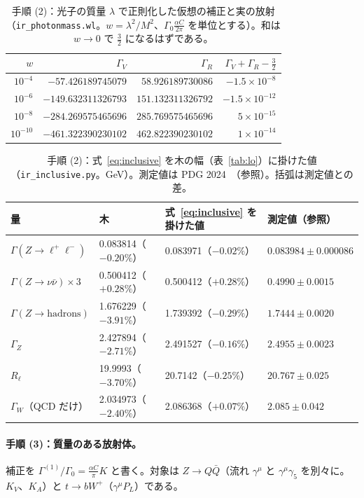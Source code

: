 \documentclass[a4paper,10pt]{ltjsarticle}
\begin{document}
\begin{table}[tbp]
\centering\small
\caption{手順 (2)：光子の質量 $\lambda$ で正則化した仮想の補正と実の放射（\texttt{ir\_photonmass.wl}。$w=\lambda^2/M^2$、$\Gamma_0\frac{\alpha C}{2\pi}$ を単位とする）。和は $w\to0$ で $\frac32$ になるはずである。}
\label{tab:photonmass}
\begin{tabular}{rrrr}
\toprule
$w$ & $\Gamma_V$ & $\Gamma_R$ & $\Gamma_V+\Gamma_R-\frac32$ \\
\midrule
$10^{-4}$ & $-57.426189745079$ & $58.926189730086$ & $-1.5\times10^{-8}$ \\
$10^{-6}$ & $-149.632311326793$ & $151.132311326792$ & $-1.5\times10^{-12}$ \\
$10^{-8}$ & $-284.269575465696$ & $285.769575465696$ & $5\times10^{-15}$ \\
$10^{-10}$ & $-461.322390230102$ & $462.822390230102$ & $1\times10^{-14}$ \\
\bottomrule
\end{tabular}
\end{table}

\begin{table}[tbp]
\centering\small
\caption{手順 (2)：式~\eqref{eq:inclusive} を木の幅（表~\ref{tab:lo}）に掛けた値（\texttt{ir\_inclusive.py}。GeV）。測定値は PDG 2024~\cite{pdg24}（参照）。括弧は測定値との差。}
\label{tab:inclusive}
\begin{tabular}{llll}
\toprule
量 & 木 & 式~\eqref{eq:inclusive} を掛けた値 & 測定値（参照） \\
\midrule
$\Gamma(Z\to\ell^+\ell^-)$ & 0.083814（$-0.20\%$） & 0.083971（$-0.02\%$） & $0.083984\pm0.000086$ \\
$\Gamma(Z\to\nu\bar\nu)\times3$ & 0.500412（$+0.28\%$） & 0.500412（$+0.28\%$） & $0.4990\pm0.0015$ \\
$\Gamma(Z\to\mathrm{hadrons})$ & 1.676229（$-3.91\%$） & 1.739392（$-0.29\%$） & $1.7444\pm0.0020$ \\
$\Gamma_Z$ & 2.427894（$-2.71\%$） & 2.491527（$-0.16\%$） & $2.4955\pm0.0023$ \\
$R_\ell$ & 19.9993（$-3.70\%$） & 20.7142（$-0.25\%$） & $20.767\pm0.025$ \\
$\Gamma_W$（QCD だけ） & 2.034973（$-2.40\%$） & 2.086368（$+0.07\%$） & $2.085\pm0.042$ \\
\bottomrule
\end{tabular}
\end{table}

\FloatBarrier
\paragraph{手順 (3)：質量のある放射体。}補正を $\Gamma^{(1)}/\Gamma_0=\frac{\alpha C}\pi K$ と書く。対象は $Z\to Q\bar Q$（流れ $\gamma^\mu$ と $\gamma^\mu\gamma_5$ を別々に。$K_V$、$K_A$）と $t\to bW^+$（$\gamma^\mu P_L$）である。
\end{document}
